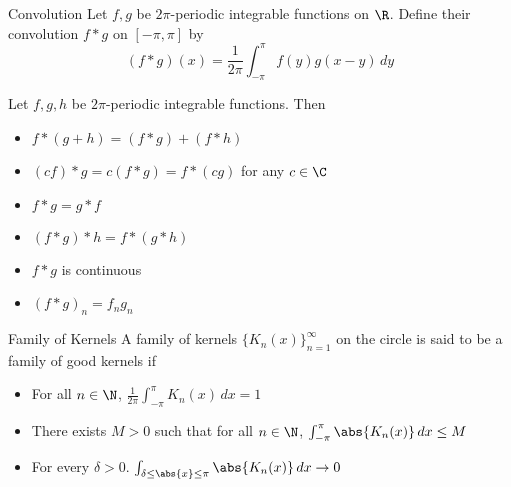\documentclass[a4paper]{article}
\begin{document}
\begin{defn}{Convolution}{} Let $f,g$ be $2\pi$-periodic integrable functions on $\R$. Define their convolution $f\ast g$ on $[-\pi,\pi]$ by $$(f\ast g)(x)=\frac{1}{2\pi}\int_{-\pi}^\pi f(y)g(x-y)\,dy$$
\end{defn}

\begin{prp}{}{} Let $f,g,h$ be $2\pi$-periodic integrable functions. Then
\begin{itemize}
\item $f\ast(g+h)=(f\ast g)+(f\ast h)$
\item $(cf)\ast g=c(f\ast g)=f\ast(cg)$ for any $c\in\C$
\item $f\ast g=g\ast f$
\item $(f\ast g)\ast h=f\ast(g\ast h)$
\item $f\ast g$ is continuous
\item $(f\ast g)_n=f_ng_n$
\end{itemize}
\end{prp}

\begin{defn}{Family of Kernels}{} A family of kernels $\{K_n(x)\}_{n=1}^\infty$ on the circle is said to be a family of good kernels if 
\begin{itemize}
\item For all $n\in\N$, $\frac{1}{2\pi}\int_{-\pi}^\pi K_n(x)\,dx=1$
\item There exists $M>0$ such that for all $n\in\N$, $\int_{-\pi}^\pi\abs{K_n(x)}\,dx\leq M$
\item For every $\delta>0$. $\int_{\delta\leq\abs{x}\leq\pi}\abs{K_n(x)}\,dx\to0$
\end{itemize}
\end{defn}
\end{document}
